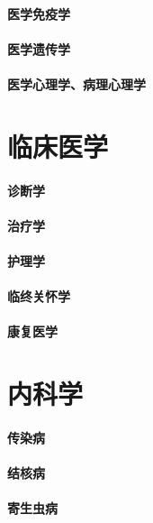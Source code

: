 \documentclass[UTF8]{../ApplicationUniverse}
\begin{document}
    \subsubsection{医学免疫学}
    \subsubsection{医学遗传学}
    \subsubsection{医学心理学、病理心理学}






\chapter{临床医学}
\subsubsection{诊断学}
\subsubsection{治疗学}
\subsubsection{护理学}
\subsubsection{临终关怀学}
\subsubsection{康复医学}









\chapter{内科学}
\subsubsection{传染病}
\subsubsection{结核病}
\subsubsection{寄生虫病}
\end{document}
